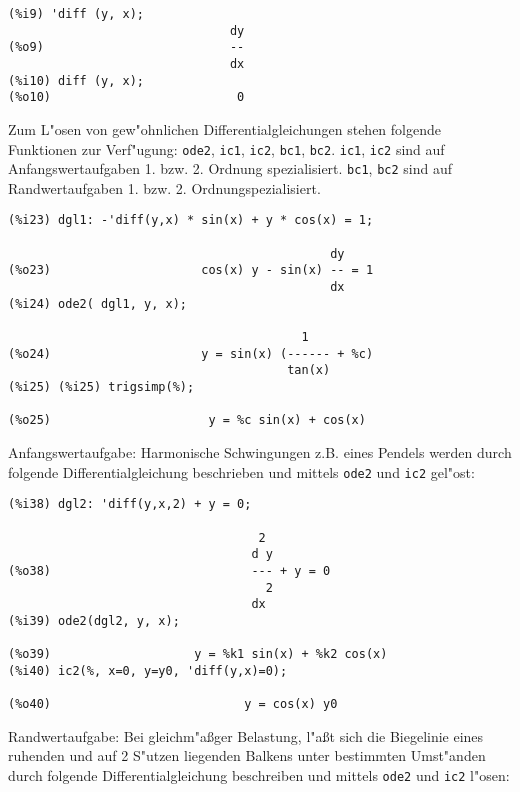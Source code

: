 \documentclass[spanish,12pt,a4paper]{article}
\begin{document}
\scriptsize
\begin{verbatim}
(%i9) 'diff (y, x);
                               dy
(%o9)                          --
                               dx
(%i10) diff (y, x);
(%o10)                          0
\end{verbatim}
\normalsize

Zum L"osen von gew"ohnlichen Differentialgleichungen stehen folgende Funktionen zur Verf"ugung: \verb|ode2|, \verb|ic1|, \verb|ic2|, \verb|bc1|, \verb|bc2|.
\verb|ic1|, \verb|ic2| sind auf Anfangswertaufgaben 1. bzw. 2. Ordnung spezialisiert.
\verb|bc1|, \verb|bc2| sind auf Randwertaufgaben 1. bzw. 2. Ordnungspezialisiert.

\scriptsize
\begin{verbatim}
(%i23) dgl1: -'diff(y,x) * sin(x) + y * cos(x) = 1;

                                             dy
(%o23)                     cos(x) y - sin(x) -- = 1
                                             dx
(%i24) ode2( dgl1, y, x);

                                         1
(%o24)                     y = sin(x) (------ + %c)
                                       tan(x)
(%i25) (%i25) trigsimp(%);

(%o25)                      y = %c sin(x) + cos(x)
\end{verbatim}
\normalsize

Anfangswertaufgabe: Harmonische Schwingungen z.B. eines Pendels werden durch folgende Differentialgleichung beschrieben und mittels \verb|ode2| und \verb|ic2| gel"ost:

\scriptsize
\begin{verbatim}
(%i38) dgl2: 'diff(y,x,2) + y = 0;

                                   2
                                  d y
(%o38)                            --- + y = 0
                                    2
                                  dx
(%i39) ode2(dgl2, y, x);

(%o39)                    y = %k1 sin(x) + %k2 cos(x)
(%i40) ic2(%, x=0, y=y0, 'diff(y,x)=0);

(%o40)                           y = cos(x) y0
\end{verbatim}
\normalsize

Randwertaufgabe: Bei gleichm"a{\ss}ger Belastung, l"a{\ss}t sich die Biegelinie eines ruhenden und auf 2 S"utzen liegenden Balkens unter bestimmten Umst"anden durch folgende Differentialgleichung beschreiben und mittels \verb|ode2| und \verb|ic2| l"osen:
\end{document}

